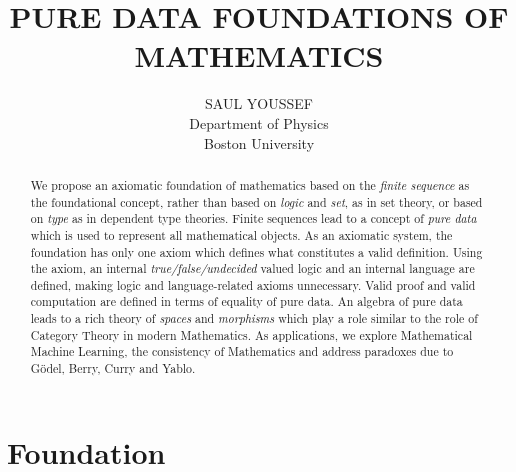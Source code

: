 \documentclass[11pt]{article}
\begin{document}
\title{\bf {PURE DATA FOUNDATIONS OF MATHEMATICS}}
\author{%
  SAUL YOUSSEF%
  \hfil \\
  Department of Physics \\
  Boston University \\
}
\maketitle
\begin{abstract}
We propose an axiomatic foundation of mathematics based on the {\it finite sequence} as the foundational concept, rather than based 
on {\it logic} and {\it set}, as in set theory, or based on {\it type} as in dependent type theories.  Finite sequences lead to a concept of {\it pure data} which is
used to represent all mathematical objects.  As an axiomatic system, the foundation has only one axiom which
defines what constitutes a valid definition.  Using the axiom, an internal {\it true/false/undecided} valued logic and an internal language are defined, making 
logic and language-related axioms unnecessary.  Valid proof and valid computation are defined in terms of equality of pure data.  An algebra of pure data
leads to a rich theory of {\it spaces} and {\it morphisms} which play a role similar to the role of Category Theory in modern Mathematics.  As applications, 
we explore Mathematical Machine Learning, the consistency of Mathematics and address paradoxes due to G\"odel, Berry, Curry and Yablo.
\end{abstract}

\section{Foundation}
\end{document}

